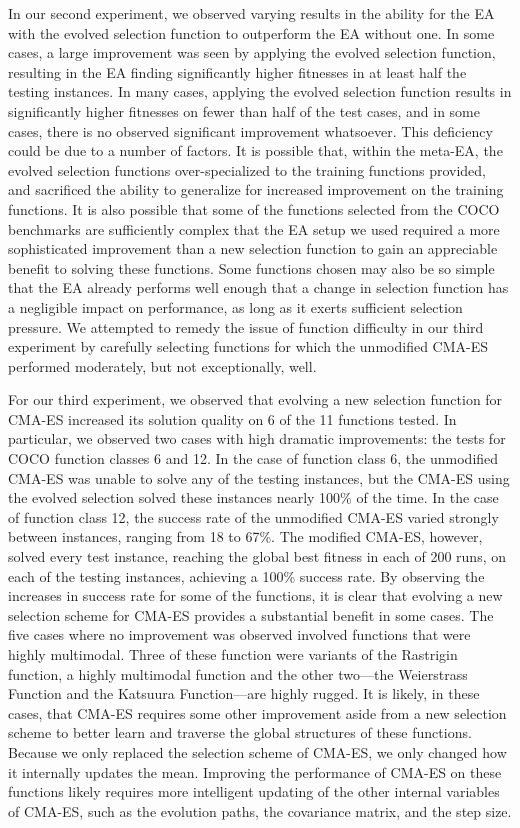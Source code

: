 \documentclass[times,12pt,titlepage]{mstogs}
\begin{document}
\begin{ThesisBody}
In our second experiment, we observed varying results in the ability for the EA with the evolved selection function to outperform the EA without one. In some cases, a large improvement was seen by applying the evolved selection function, resulting in the EA finding significantly higher fitnesses in at least half the testing instances. In many cases, applying the evolved selection function results in significantly higher fitnesses on fewer than half of the test cases, and in some cases, there is no observed significant improvement whatsoever. This deficiency could be due to a number of factors. It is possible that, within the meta-EA, the evolved selection functions over-specialized to the training functions provided, and sacrificed the ability to generalize for increased improvement on the training functions. It is also possible that some of the functions selected from the COCO benchmarks are sufficiently complex that the EA setup we used required a more sophisticated improvement than a new selection function to gain an appreciable benefit to solving these functions. Some functions chosen may also be so simple that the EA already performs well enough that a change in selection function has a negligible impact on performance, as long as it exerts sufficient selection pressure. We attempted to remedy the issue of function difficulty in our third experiment by carefully selecting functions for which the unmodified CMA-ES performed moderately, but not exceptionally, well.

For our third experiment, we observed that evolving a new selection function for CMA-ES increased its solution quality on 6 of the 11 functions tested. In particular, we observed two cases with high dramatic improvements: the tests for COCO function classes 6 and 12. In the case of function class 6, the unmodified CMA-ES was unable to solve any of the testing instances, but the CMA-ES using the evolved selection solved these instances nearly 100\% of the time. In the case of function class 12, the success rate of the unmodified CMA-ES varied strongly between instances, ranging from 18 to 67\%. The modified CMA-ES, however, solved every test instance, reaching the global best fitness in each of 200 runs, on each of the testing instances, achieving a 100\% success rate. By observing the increases in success rate for some of the functions, it is clear that evolving a new selection scheme for CMA-ES provides a substantial benefit in some cases. The five cases where no improvement was observed involved functions that were highly multimodal. Three of these function were variants of the Rastrigin function, a highly multimodal function and the other two---the Weierstrass Function and the Katsuura Function---are highly rugged. It is likely, in these cases, that CMA-ES requires some other improvement aside from a new selection scheme to better learn and traverse the global structures of these functions. Because we only replaced the selection scheme of CMA-ES, we only changed how it internally updates the mean. Improving the performance of CMA-ES on these functions likely requires more intelligent updating of the other internal variables of CMA-ES, such as the evolution paths, the covariance matrix, and the step size.
 

\end{ThesisBody}
\end{document}
